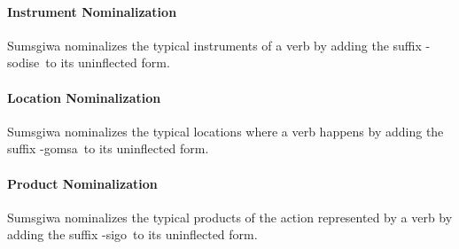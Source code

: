 \paragraph{Instrument Nominalization}
Sumsgiwa nominalizes the typical instruments of a verb by adding the suffix -\textlangle sodise\textrangle~to its uninflected form.

\paragraph{Location Nominalization}
Sumsgiwa nominalizes the typical locations where a verb happens by adding the suffix -\textlangle gomsa\textrangle~to its uninflected form.

\paragraph{Product Nominalization}
Sumsgiwa nominalizes the typical products of the action represented by a verb by adding the suffix -\textlangle sigo\textrangle~to its uninflected form.
